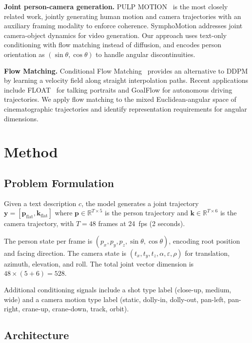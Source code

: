 \documentclass[10pt,twocolumn,letterpaper]{article}
\begin{document}
\textbf{Joint person-camera generation.}
PULP MOTION~\cite{pulpmotion2025} is the most closely related work, jointly generating human motion and camera trajectories with an auxiliary framing modality to enforce coherence. SymphoMotion addresses joint camera-object dynamics for video generation. Our approach uses text-only conditioning with flow matching instead of diffusion, and encodes person orientation as $(\sin\theta, \cos\theta)$ to handle angular discontinuities.

\textbf{Flow Matching.}
Conditional Flow Matching~\cite{lipman2023flow} provides an alternative to DDPM by learning a velocity field along straight interpolation paths. Recent applications include FLOAT~\cite{float2025} for talking portraits and GoalFlow for autonomous driving trajectories. We apply flow matching to the mixed Euclidean-angular space of cinematographic trajectories and identify representation requirements for angular dimensions.

\section{Method}

\subsection{Problem Formulation}

Given a text description $c$, the model generates a joint trajectory $\mathbf{y} = [\mathbf{p}_\text{flat}, \mathbf{k}_\text{flat}]$ where $\mathbf{p} \in \mathbb{R}^{T \times 5}$ is the person trajectory and $\mathbf{k} \in \mathbb{R}^{T \times 6}$ is the camera trajectory, with $T = 48$ frames at 24~fps (2 seconds).

The person state per frame is $(p_x, p_y, p_z, \sin\theta, \cos\theta)$, encoding root position and facing direction. The camera state is $(t_x, t_y, t_z, \alpha, \varepsilon, \rho)$ for translation, azimuth, elevation, and roll. The total joint vector dimension is $48 \times (5 + 6) = 528$.

Additional conditioning signals include a shot type label (close-up, medium, wide) and a camera motion type label (static, dolly-in, dolly-out, pan-left, pan-right, crane-up, crane-down, track, orbit).

\subsection{Architecture}
\end{document}

